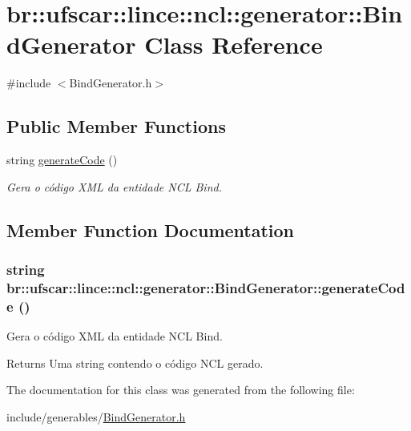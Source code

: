 \hypertarget{classbr_1_1ufscar_1_1lince_1_1ncl_1_1generator_1_1BindGenerator}{
\section{br::ufscar::lince::ncl::generator::BindGenerator Class Reference}
\label{classbr_1_1ufscar_1_1lince_1_1ncl_1_1generator_1_1BindGenerator}
}


{\ttfamily \#include $<$BindGenerator.h$>$}

\subsection*{Public Member Functions}
\begin{DoxyCompactItemize}
\item 
string \hyperlink{classbr_1_1ufscar_1_1lince_1_1ncl_1_1generator_1_1BindGenerator_ad0e85ccbdac46f9e577d5055b78d78c0}{generateCode} ()
\begin{DoxyCompactList}\small\item\em Gera o código XML da entidade NCL Bind. \item\end{DoxyCompactList}\end{DoxyCompactItemize}


\subsection{Member Function Documentation}
\hypertarget{classbr_1_1ufscar_1_1lince_1_1ncl_1_1generator_1_1BindGenerator_ad0e85ccbdac46f9e577d5055b78d78c0}{
\subsubsection[{generateCode}]{\setlength{\rightskip}{0pt plus 5cm}string br::ufscar::lince::ncl::generator::BindGenerator::generateCode ()}}
\label{classbr_1_1ufscar_1_1lince_1_1ncl_1_1generator_1_1BindGenerator_ad0e85ccbdac46f9e577d5055b78d78c0}


Gera o código XML da entidade NCL Bind. 

\begin{DoxyReturn}{Returns}
Uma string contendo o código NCL gerado. 
\end{DoxyReturn}


The documentation for this class was generated from the following file:\begin{DoxyCompactItemize}
\item 
include/generables/\hyperlink{BindGenerator_8h}{BindGenerator.h}\end{DoxyCompactItemize}
